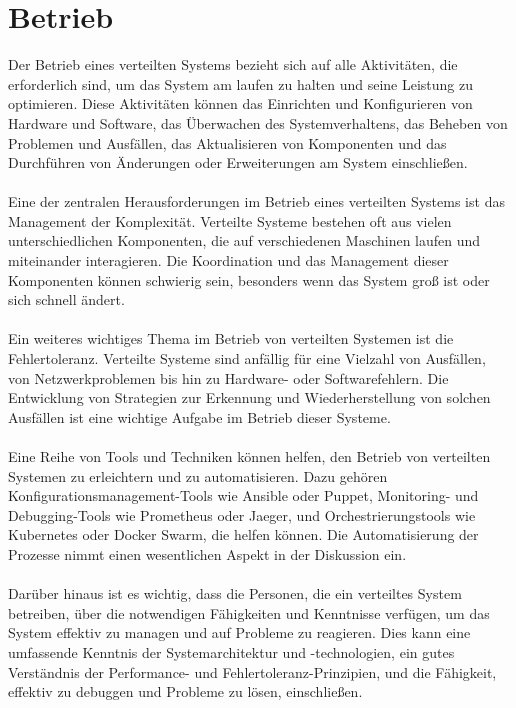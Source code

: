 \documentclass[../vs-script-first-v01.tex]{subfiles}
\begin{document}
\section{Betrieb}
Der Betrieb eines verteilten Systems bezieht sich auf alle Aktivitäten, die erforderlich sind, um das System am laufen zu halten und seine Leistung zu optimieren. Diese Aktivitäten können das Einrichten und Konfigurieren von Hardware und Software, das Überwachen des Systemverhaltens, das Beheben von Problemen und Ausfällen, das Aktualisieren von Komponenten und das Durchführen von Änderungen oder Erweiterungen am System einschließen.
\\\\
Eine der zentralen Herausforderungen im Betrieb eines verteilten Systems ist das Management der Komplexität. Verteilte Systeme bestehen oft aus vielen unterschiedlichen Komponenten, die auf verschiedenen Maschinen laufen und miteinander interagieren. Die Koordination und das Management dieser Komponenten können schwierig sein, besonders wenn das System groß ist oder sich schnell ändert.
\\\\
Ein weiteres wichtiges Thema im Betrieb von verteilten Systemen ist die Fehlertoleranz. Verteilte Systeme sind anfällig für eine Vielzahl von Ausfällen, von Netzwerkproblemen bis hin zu Hardware- oder Softwarefehlern. Die Entwicklung von Strategien zur Erkennung und Wiederherstellung von solchen Ausfällen ist eine wichtige Aufgabe im Betrieb dieser Systeme.
\\\\
Eine Reihe von Tools und Techniken können helfen, den Betrieb von verteilten Systemen zu erleichtern und zu automatisieren. Dazu gehören Konfigurationsmanagement-Tools wie Ansible oder Puppet, Monitoring- und Debugging-Tools wie Prometheus oder Jaeger, und Orchestrierungstools wie Kubernetes oder Docker Swarm, die helfen können. Die Automatisierung der Prozesse nimmt einen wesentlichen Aspekt in der Diskussion ein.
\\\\
Darüber hinaus ist es wichtig, dass die Personen, die ein verteiltes System betreiben, über die notwendigen Fähigkeiten und Kenntnisse verfügen, um das System effektiv zu managen und auf Probleme zu reagieren. Dies kann eine umfassende Kenntnis der Systemarchitektur und -technologien, ein gutes Verständnis der Performance- und Fehlertoleranz-Prinzipien, und die Fähigkeit, effektiv zu debuggen und Probleme zu lösen, einschließen.
\end{document}
